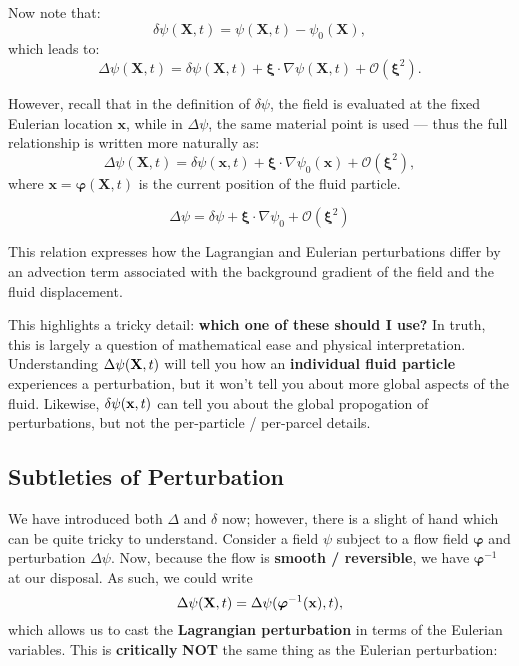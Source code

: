 Now note that:
\[
\delta \psi(\mathbf{X}, t) = \psi(\mathbf{X}, t) - \psi_0(\mathbf{X}),
\]
which leads to:
\[
\Delta \psi(\mathbf{X}, t) = \delta \psi(\mathbf{X}, t) + \boldsymbol{\xi} \cdot \nabla \psi(\mathbf{X}, t) + \mathcal{O}(\boldsymbol{\xi}^2).
\]

However, recall that in the definition of \( \delta \psi \), the field is evaluated at the fixed Eulerian location \( \mathbf{x} \), while in \( \Delta \psi \), the same material point is used — thus the full relationship is written more naturally as:
\[
\Delta \psi(\mathbf{X}, t) = \delta \psi(\mathbf{x}, t) + \boldsymbol{\xi} \cdot \nabla \psi_0(\mathbf{x}) + \mathcal{O}(\boldsymbol{\xi}^2),
\]
where \( \mathbf{x} = \boldsymbol{\varphi}(\mathbf{X}, t) \) is the current position of the fluid particle.

\begin{tcolorbox}[colback=blue!5!white, colframe=blue!75!black, title=Key Identity]
\begin{equation}
\label{eq:perturbation_conversion}
    \boxed{
\Delta \psi = \delta \psi + \boldsymbol{\xi} \cdot \nabla \psi_0 + \mathcal{O}(\boldsymbol{\xi}^2)
}
\end{equation}

This relation expresses how the Lagrangian and Eulerian perturbations differ by an advection term associated with the background gradient of the field and the fluid displacement.
\end{tcolorbox}

\begin{remark}
This highlights a tricky detail: \textbf{which one of these should I use?} In truth, this is largely a question of mathematical ease and physical interpretation. Understanding $\Delta \psi({\bf X},t)$ will tell you how an \textbf{individual fluid particle} experiences a perturbation, but it won't tell you about more global aspects of the fluid. Likewise, $\delta \psi({\bf x},t)$ can tell you about the global propogation of perturbations, but not the per-particle / per-parcel details.
\end{remark}

\subsection{Subtleties of Perturbation}

We have introduced both $\Delta$ and $\delta$ now; however, there is a slight of hand which can be quite tricky to understand. Consider a field $\psi$ subject to a flow field $\boldsymbol{\varphi}$ and perturbation $\Delta \psi$. Now, because the flow is \textbf{smooth / reversible}, we have $\boldsymbol{\varphi}^{-1}$ at our disposal. As such, we could write
\[
\Delta \psi({\bf X},t) = \Delta \psi(\boldsymbol{\varphi}^{-1}({\bf x}), t),
\]
which allows us to cast the \textbf{Lagrangian perturbation} in terms of the Eulerian variables. This is \textbf{critically} \textbf{NOT} the same thing as the Eulerian perturbation:

